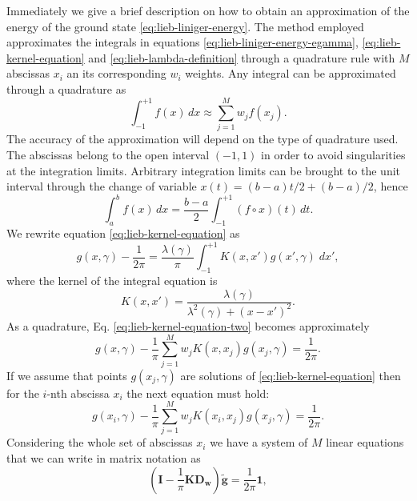 Immediately we give a brief description on how to obtain an approximation of the
energy of the ground state \eqref{eq:lieb-liniger-energy}. The method employed
approximates the integrals in equations \eqref{eq:lieb-liniger-energy-egamma},
\eqref{eq:lieb-kernel-equation} and \eqref{eq:lieb-lambda-definition} through a
quadrature rule with $M$ abscissas $x_i$ an its corresponding $w_i$ weights. Any
integral can be approximated through a quadrature as
%
\begin{equation}
	\int_{-1}^{+1} f(x) \, dx \approx \sum_{j=1}^{M} w_j f(x_j).
\end{equation}
%
The accuracy of the approximation will depend on the type of quadrature used.
The abscissas belong to the open interval  $(-1, 1)$ in order to avoid
singularities at the integration limits. Arbitrary integration limits can be
brought to the unit interval through the change of variable $x(t) = (b - a)t/2
	+ (b - a)/2$, hence
%
\begin{equation}
	\int_{a}^{b} f(x) \, dx = \frac{b-a}{2} \int_{-1}^{+1} (f \circ x)(t) \, dt.
\end{equation}
%
We rewrite equation \eqref{eq:lieb-kernel-equation} as
%
\begin{equation}
	\label{eq:lieb-kernel-equation-two}
	g(x, \gamma) - \frac{1}{2\pi} = \frac{\lambda(\gamma)}{\pi} \int_{-1}^{+1} K(x, x') g(x', \gamma) \; dx',
\end{equation}
%
where the kernel of the integral equation is
%
\begin{equation}
	K(x, x') = \frac{\lambda(\gamma)}{\lambda^2(\gamma) + (x - x')^2}.
\end{equation}
%
As a quadrature, Eq. \eqref{eq:lieb-kernel-equation-two} becomes approximately
%
\begin{equation}
	\label{eq:lieb-kernel-equation-quad}
	g(x, \gamma) - \frac{1}{\pi} \sum_{j=1}^{M} w_j K(x, x_j)  g(x_j, \gamma) = \frac{1}{2\pi}.
\end{equation}
%
If we assume that points $g(x_j, \gamma)$ are solutions of
\eqref{eq:lieb-kernel-equation} then for the $i$-nth abscissa $x_i$ the next
equation must hold:
%
\begin{equation}
	\label{eq:lieb-kernel-equation-quad-equation}
	g(x_i, \gamma) - \frac{1}{\pi} \sum_{j=1}^{M} w_j K(x_i, x_j)  g(x_j, \gamma) = \frac{1}{2\pi}.
\end{equation}
%
Considering the whole set of abscissas $x_i$ we have a system of $M$ linear
equations that we can write in matrix notation as
%
\begin{equation}
	\label{eq:lieb-kernel-linear-equation-system}
	\left( \mathbf{I} - \frac{1}{\pi} \mathbf{K} \mathbf{D_w} \right)\mathbf{\tilde{g}} =
	\frac{1}{2\pi} \mathbf{1},
\end{equation}
